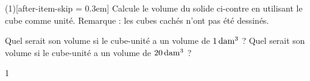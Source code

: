 \documentclass[a4paper,11pt]{report}
\begin{document}
\begin{exo}{
\begin{minipage}[t]{0.6\textwidth}{
\vspace{0pt}
\begin{tasks}(1)[after-item-skip = 0.3em]
    \task Calcule le volume du solide ci-contre en utilisant le cube comme unité. Remarque : les cubes cachés n'ont pas été dessinés. 
\end{tasks}
}
\end{minipage}
\begin{minipage}[t]{0.4\textwidth}{
\vspace{0pt}
\begin{center}
\end{center}
}
\end{minipage}
\begin{tasks}[after-item-skip = 0.3em]
	\task[b)] Quel serait  son volume si le cube-unité a un volume de $\tunit{1}{\deca m^3}$ ? 
	\task[c)] Quel serait  son volume si le cube-unité a un volume de $\tunit{20}{\deca m^3}$ ? 
\end{tasks}
}{1}
\end{exo}
\end{document}
